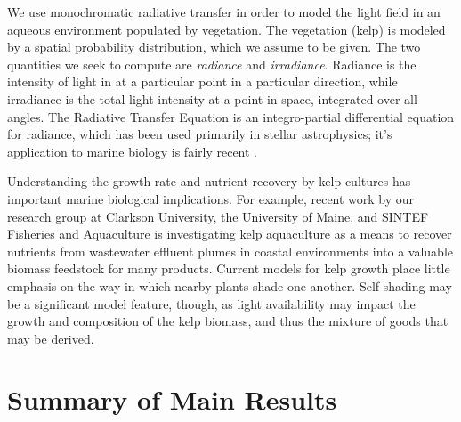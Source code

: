 We use monochromatic radiative transfer in order to model the light field in an aqueous environment populated by vegetation.
The vegetation (kelp) is modeled by a spatial probability distribution, which we assume to be given.
The two quantities we seek to compute are \textit{radiance} and \textit{irradiance}.
Radiance is the intensity of light in at a particular point in a particular direction, while irradiance is the total light intensity at a point in space, integrated over all angles.
The Radiative Transfer Equation is an integro-partial differential equation for radiance, which has been used primarily in stellar astrophysics; it's application to marine biology is fairly recent \cite{mobley_radiative_2001}.

Understanding the growth rate and nutrient recovery by
kelp cultures has important marine biological implications. For example, recent
work by our research group at Clarkson University, the University of Maine, and
SINTEF Fisheries and Aquaculture is investigating kelp aquaculture as a means to
recover nutrients from wastewater effluent plumes in coastal environments into a
valuable biomass feedstock for many products. Current models for kelp growth
place little emphasis on the way in which nearby plants shade one another.
Self-shading may be a significant model feature, though, as light availability
may impact the growth and composition of the kelp biomass, and thus the mixture
of goods that may be derived.


\section{Summary of Main Results}
